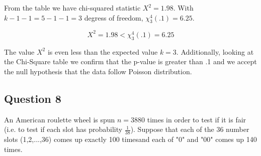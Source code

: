 \documentclass{tufte-book}
\theoremstyle{mytheoremstyle}
\theoremstyle{mylemstyle}
\theoremstyle{mydefstyle}
\begin{document}
From the table we have chi-squared statistic $X^2=1.98$.  With $k-1-1=5-1-1=3$ degress of freedom, $\chi_3^4(.1) = 6.25$.

\[ X^2 = 1.98 < \chi_3^4(.1) = 6.25 \]

The value $X^2$ is even less than the expected value $k=3$.  Additionally, looking at the Chi-Square table we confirm that the p-value is greater than .1 and we accept the null hypothesis that the data follow Poisson distribution.

\subsection{Question 8}
An American roulette wheel is spun $n=3880$ times in order to test if it is fair (i.e. to test if each slot has probability $\frac{1}{38}$).  Suppose that each of the 36 number slots (1,2,...,36) comes up exactly 100 timesand each of "$0$" and "$00$" comes up 140 times.
\end{document}
